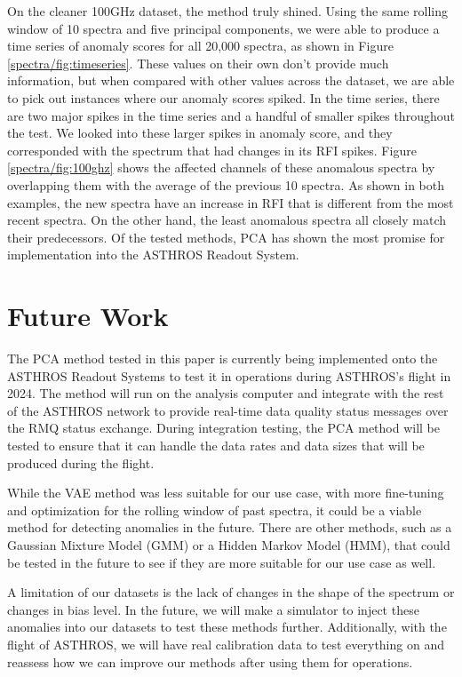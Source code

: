 On the cleaner 100GHz dataset, the method truly shined.
Using the same rolling window of 10 spectra and five principal components, we were able to produce a time series of anomaly scores for all 20,000 spectra, as shown in Figure \ref{spectra/fig:timeseries}.
These values on their own don't provide much information, but when compared with other values across the dataset, we are able to pick out instances where our anomaly scores spiked. 
In the time series, there are two major spikes in the time series and a handful of smaller spikes throughout the test. 
We looked into these larger spikes in anomaly score, and they corresponded with the spectrum that had changes in its RFI spikes.
Figure \ref{spectra/fig:100ghz} shows the affected channels of these anomalous spectra by overlapping them with the average of the previous 10 spectra. 
As shown in both examples, the new spectra have an increase in RFI that is different from the most recent spectra. 
On the other hand, the least anomalous spectra all closely match their predecessors. 
Of the tested methods, PCA has shown the most promise for implementation into the ASTHROS Readout System. 

\section{Future Work}
\label{spectra/sec:future}
The PCA method tested in this paper is currently being implemented onto the ASTHROS Readout Systems to test it in operations during ASTHROS's flight in 2024. 
The method will run on the analysis computer and integrate with the rest of the ASTHROS network to provide real-time data quality status messages over the RMQ status exchange.
During integration testing, the PCA method will be tested to ensure that it can handle the data rates and data sizes that will be produced during the flight. 

While the VAE method was less suitable for our use case, with more fine-tuning and optimization for the rolling window of past spectra, it could be a viable method for detecting anomalies in the future.
There are other methods, such as a Gaussian Mixture Model (GMM) or a Hidden Markov Model (HMM), that could be tested in the future to see if they are more suitable for our use case as well.

A limitation of our datasets is the lack of changes in the shape of the spectrum or changes in bias level. 
In the future, we will make a simulator to inject these anomalies into our datasets to test these methods further. 
Additionally, with the flight of ASTHROS, we will have real calibration data to test everything on and reassess how we can improve our methods after using them for operations.